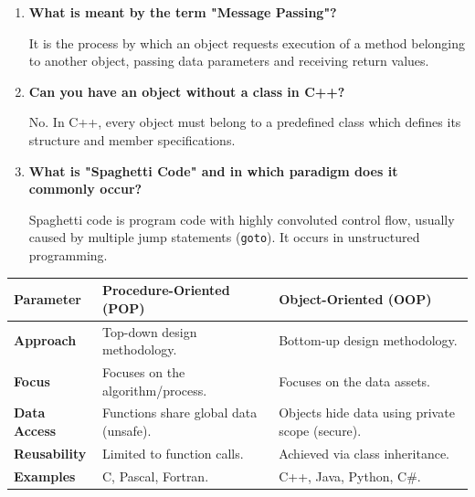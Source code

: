 \documentclass[12pt,a4paper]{article}
\newcommand{\Q}[1]{\textbf{#1}\par\noindent\ignorespaces}
\renewcommand{\arraystretch}{1.45}
\begin{document}
\begin{tcolorbox}[exambox, title={\textbf{Frequently Asked / Viva Questions}}]
\begin{enumerate}[topsep=0pt, label=\textbf{Q\arabic*.}, itemsep=5pt]
  \item \Q{What is meant by the term "Message Passing"?}
    It is the process by which an object requests execution of a method belonging to another object, passing data parameters and receiving return values.
  \item \Q{Can you have an object without a class in C++?}
    No. In C++, every object must belong to a predefined class which defines its structure and member specifications.
  \item \Q{What is "Spaghetti Code" and in which paradigm does it commonly occur?}
    Spaghetti code is program code with highly convoluted control flow, usually caused by multiple jump statements (\texttt{goto}). It occurs in unstructured programming.
\end{enumerate}
\end{tcolorbox}

\begin{tcolorbox}[tikzbox, title={Comparison of POP and OOP Paradigms}]
\renewcommand{\arraystretch}{1.45}
\par\noindent
\begin{tabularx}{\linewidth}{|B{3.2cm}|Y|Y|}
\hline
\textbf{Parameter} & \textbf{\color{myteal}Procedure-Oriented (POP)} & \textbf{\color{mygreen}Object-Oriented (OOP)} \\
\hline
\textbf{Approach} & Top-down design methodology. & Bottom-up design methodology. \\
\hline
\textbf{Focus} & Focuses on the algorithm/process. & Focuses on the data assets. \\
\hline
\textbf{Data Access} & Functions share global data (unsafe). & Objects hide data using private scope (secure). \\
\hline
\textbf{Reusability} & Limited to function calls. & Achieved via class inheritance. \\
\hline
\textbf{Examples} & C, Pascal, Fortran. & C++, Java, Python, C\#. \\
\hline
\end{tabularx}
\end{tcolorbox}
\end{document}
